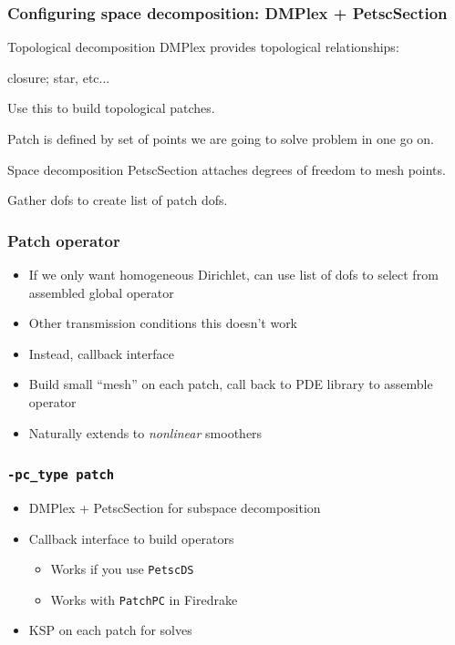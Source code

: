 \documentclass[presentation,aspectratio=43]{beamer}
\begin{document}
\begin{frame}
  \frametitle{Configuring space decomposition: DMPlex + PetscSection}
  \begin{block}{Topological decomposition}
    DMPlex provides topological relationships:

    closure; star, etc...

    Use this to build topological patches.

    Patch is defined by set of points we are going to solve problem in
    one go on.
  \end{block}

  \begin{block}{Space decomposition}
    PetscSection attaches degrees of freedom to mesh points.

    Gather dofs to create list of patch dofs.
  \end{block}
\end{frame}

\begin{frame}
  \frametitle{Patch operator}
  \begin{itemize}
  \item If we only want homogeneous Dirichlet, can use list of dofs to
    select from assembled global operator
  \item Other transmission conditions this doesn't work
  \item Instead, callback interface
  \item Build small ``mesh'' on each patch, call back to PDE library
    to assemble operator
  \item Naturally extends to \emph{nonlinear} smoothers
  \end{itemize}
\end{frame}


\begin{frame}
  \frametitle{\texttt{-pc\_type patch}}
  \begin{itemize}
  \item DMPlex + PetscSection for subspace decomposition
  \item Callback interface to build operators
    \begin{itemize}
    \item Works if you use \texttt{PetscDS}
    \item Works with \texttt{PatchPC} in Firedrake
    \end{itemize}
  \item KSP on each patch for solves
  \end{itemize}
\end{frame}
\end{document}

